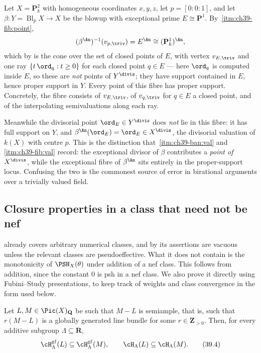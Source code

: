 \begin{example}
\label{ex:ch39-fibre-plane}
Let $X=\mathbf P^2_k$ with homogeneous coordinates $x,y,z$, let
$p=[0:0:1]$, and let $\beta:Y=\operatorname{Bl}_pX\to X$ be the blowup
with exceptional prime $E\cong\mathbf P^1$.  By
\,\cref{itm:ch39-fib:point},
\[
 (\beta^{\An})^{-1}(v_{p,\triv})=E^{\An}\cong(\mathbf P^1_k)^{\An},
\]
which by  is the cone over the set of
closed points of $E$, with vertex $v_{E,\triv}$ and one ray
$\{t\,\ord_q:t\ge0\}$ for each closed point $q\in E$ --- here
$\ord_q$ is computed inside $E$, so these are \emph{not} points of
$Y^{\divis}$; they have support contained in $E$, hence proper support
in $Y$.  Every point of this fibre has proper support.  Concretely, the
fibre consists of $v_{E,\triv}$, of $v_{q,\triv}$ for $q\in E$ a
closed point, and of the interpolating semivaluations along each ray.

Meanwhile the divisorial point $\ord_E\in Y^{\divis}$ does \emph{not}
lie in this fibre: it has full support on $Y$, and
$\beta^{\An}(\ord_E)=\ord_E\in X^{\divis}$, the divisorial valuation of
$k(X)$ with centre $p$.  This is the distinction that
\,\cref{itm:ch39-ban:val} and
\,\cref{itm:ch39-fib:val} record: the exceptional
divisor of $\beta$ contributes a \emph{point of $X^{\divis}$}, while
the exceptional fibre of $\beta^{\An}$ sits entirely in the
proper-support locus.  Confusing the two is the commonest source of error
in birational arguments over a trivially valued field.
\end{example}

\subsection{Closure properties in a class that need not be nef}
\label{sec:ch39-closure}

 already covers arbitrary numerical classes, and
by  its assertions are vacuous unless the
relevant classes are pseudoeffective.  What it does not contain is the
monotonicity of $\PSH_X(\theta)$ under addition of a nef class.  This
follows from addition, since the constant $0$ is psh in a nef class.
We also prove it directly using Fubini--Study presentations, to keep track
of weights and class convergence in the form used below.

\begin{lemma}
\label{lem:ch39-hgf-monotone}
Let $L,M\in\Pic(X)_{\mathbf Q}$ be such that $M-L$ is semiample, that
is, such that $r(M-L)$ is a globally generated line bundle for some
$r\in\mathbf Z_{>0}$.  Then, for every additive subgroup
$\Lambda\subseteq\mathbf R$,
\[
 \cH^{\mathrm{gf}}_\Lambda(L)\subseteq\cH^{\mathrm{gf}}_\Lambda(M),
 \qquad
 \cH_\Lambda(L)\subseteq\cH_\Lambda(M).
\tag{39.4}\label{eq:ch39-hgf-monotone}
\]
\end{lemma}

